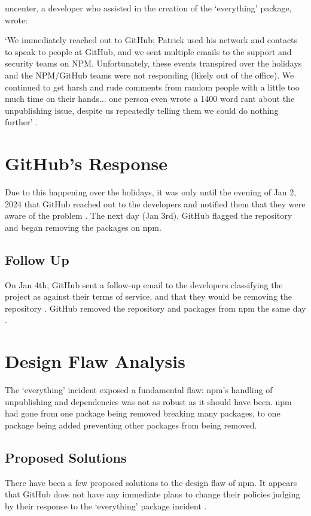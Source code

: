 \documentclass[acmsmall]{acmart}
\begin{document}
uncenter, a developer who assisted in the creation of the `everything' package,
wrote:

`We immediately reached out to GitHub; Patrick used his network and contacts to
speak to people at GitHub, and we sent multiple emails to the support and
security teams on NPM. Unfortunately, these events transpired over the holidays
and the NPM/GitHub teams were not responding (likely out of the office). We
continued to get harsh and rude comments from random people with a little too
much time on their hands... one person even wrote a 1400 word rant about the
unpublishing issue, despite us repeatedly telling them we could do nothing
further' \cite{uncenter-blog-everything}.

\section{GitHub's Response}
Due to this happening over the holidays, it was only until the evening of Jan 2,
2024 that GitHub reached out to the developers and notified them that they were
aware of the problem \cite{uncenter-blog-everything}. The next day (Jan 3rd),
GitHub flagged the repository and began removing the packages on npm.

\subsection{Follow Up}
On Jan 4th, GitHub sent a follow-up email to the developers classifying the
project as against their terms of service, and that they would be removing the
repository \cite{uncenter-blog-everything}. GitHub removed the repository and
packages from npm the same day \cite{scmagazine-everything-blog}.

\section{Design Flaw Analysis}
The `everything' incident exposed a fundamental flaw: npm's handling of
unpublishing and dependencies was not as robust as it should have been. npm
had gone from one package being removed breaking many packages, to one package
being added preventing other packages from being removed.

\subsection{Proposed Solutions}
There have been a few proposed solutions to the design flaw of npm. It appears
that GitHub does not have any immediate plans to change their policies judging
by their response to the `everything' package incident
\cite{uncenter-blog-everything}.
\end{document}
